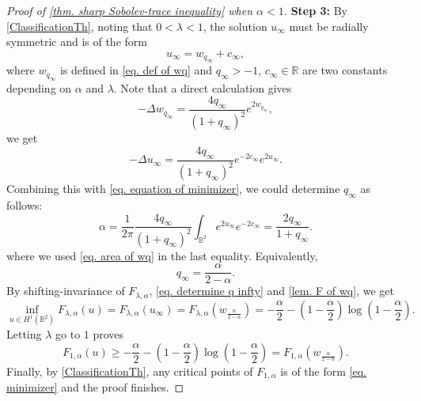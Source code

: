 \documentclass[11pt,a4paper,twoside]{amsart}
\newtheorem{sketch proof}{Sketch of the proof}[section]
\begin{document}
\begin{proof}[Proof of \cref{thm. sharp Sobolev-trace inequality} when $\alpha<1$]
        {\bf Step 3:}
        By \cref{ClassificationTh}, noting that $0<\lambda<1$, the solution $u_\infty$ must be radially symmetric and is of the form
        \[
        u_\infty=w_{q_\infty}+c_\infty,
        \]
        where $w_{q_\infty}$ is defined in \cref{eq. def of wq} and $q_\infty>-1$, $c_\infty\in\mathbb{R}$ are two constants depending on $\alpha$ and $\lambda$.
        Note that a direct calculation gives
        \[
        -\Delta w_{q_\infty}
        =\frac{4q_\infty}{(1+q_\infty)^2}
        e^{2w_{q_\infty}},
        \]
        we get
        \[
        -\Delta u_\infty
        =\frac{4q_\infty}{(1+q_\infty)^2}e^{-2c_\infty}
        e^{2u_\infty}.
        \]
        Combining this with \cref{eq. equation of minimizer}, we could determine $q_\infty$ as follows:
        \[
        \alpha=\frac{1}{2\pi}
        \frac{4q_\infty}{(1+q_\infty)^2}
        \int_{\mathbb{B}^2}
        e^{2u_\infty}e^{-2c_\infty}
        =\frac{2q_\infty}{1+q_\infty}.
        \]
        where we used \cref{eq. area of wq} in the last equality. Equivalently,
        \begin{equation}\label{eq. determine q infty}
            q_\infty=\frac{\alpha}{2-\alpha}.
        \end{equation}
        By shifting-invariance of $F_{\lambda,\alpha}$, \cref{eq. determine q infty} and \cref{lem. F of wq}, we get
        \[
        \inf_{u\in H^1(\mathbb{B}^2)}
        F_{\lambda,\alpha}(u)
        =F_{\lambda,\alpha}(u_\infty)
        =F_{\lambda,\alpha}
        (w_{\frac{\alpha}{2-\alpha}})
        =-\frac{\alpha}{2}
        -\left(1-\frac{\alpha}{2}\right)
        \log \left(1-\frac{\alpha}{2}\right).
        \]
        Letting $\lambda$ go to $1$ proves
        \[
        F_{1,\alpha}(u)\geq 
         -\frac{\alpha}{2}
        -\left(1-\frac{\alpha}{2}\right)
        \log \left(1-\frac{\alpha}{2}\right)
        =F_{1,\alpha}(w_{\frac{\alpha}{2-\alpha}}).
        \]
        Finally, by \cref{ClassificationTh}, any critical points of $F_{1,\alpha}$ is of the form \cref{eq. minimizer} and 
        the proof finishes.
    \end{proof}
\end{document}
